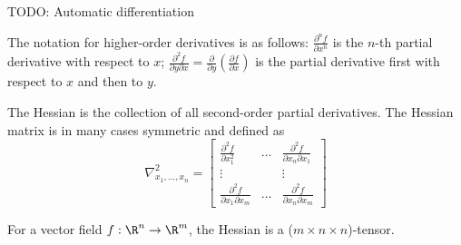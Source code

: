 TODO: Automatic differentiation

The notation for higher-order derivatives is as follows:
$\frac{\partial^n f}{\partial x^n}$ is the $n$-th partial derivative with respect to $x$;
$\frac{\partial^2 f}{\partial y \partial x} = \frac{\partial}{\partial y} \left( \frac{\partial f}{\partial x} \right)$ is the partial derivative first with respect to $x$ and then to $y$.

The Hessian is the collection of all second-order partial derivatives.
The Hessian matrix is in many cases symmetric and defined as
\begin{equation*}
    \nabla^2_{x_1, \dotsc, x_n} =
    \begin{bmatrix}
        \frac{\partial^2 f}{\partial x_1^2} & \dots & \frac{\partial^2 f}{\partial x_n \partial x_1} \\
        \vdots & & \vdots \\
        \frac{\partial^2 f}{\partial x_1 \partial x_m} & \dots & \frac{\partial^2 f}{\partial x_n \partial x_m}
    \end{bmatrix}
\end{equation*}

For a vector field $f : \R^{n} \to \R^m$,
the Hessian is a ($m \times n \times n$)-tensor.
